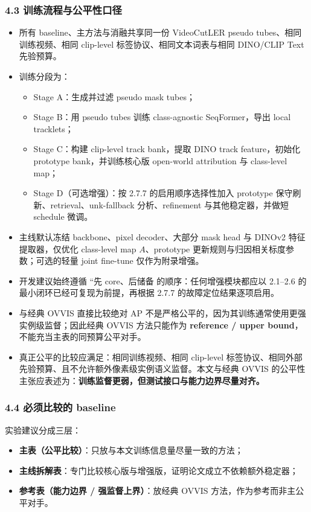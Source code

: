 \documentclass[UTF8]{ctexart}
\begin{document}
\subsubsection*{4.3 训练流程与公平性口径}
\begin{itemize}
\item 所有 baseline、主方法与消融共享同一份 VideoCutLER pseudo tubes、相同训练视频、相同 clip-level 标签协议、相同文本词表与相同 DINO/CLIP Text 先验预算。
\item 训练分段为：
\begin{itemize}
\item Stage A：生成并过滤 pseudo mask tubes；
\item Stage B：用 pseudo tubes 训练 class-agnostic SeqFormer，导出 local tracklets；
\item Stage C：构建 clip-level track bank，提取 DINO track feature，初始化 prototype bank，并训练核心版 open-world attribution 与 class-level map；
\item Stage D（可选增强）：按 2.7.7 的启用顺序选择性加入 prototype 保守刷新、retrieval、unk-fallback 分析、refinement 与其他稳定器，并做短 schedule 微调。
\end{itemize}
\item 主线默认冻结 backbone、pixel decoder、大部分 mask head 与 DINOv2 特征提取器，仅优化 class-level map $A$、prototype 更新规则与归因相关标度参数；可选的轻量 joint fine-tune 仅作为附录增强。
\item 开发建议始终遵循 ``先 core、后储备 的顺序：任何增强模块都应以 2.1--2.6 的最小闭环已经可复现为前提，再根据 2.7.7 的故障定位结果逐项启用。
\item 与经典 OVVIS 直接比较绝对 AP 不是严格公平的，因为其训练通常使用更强实例级监督；因此经典 OVVIS 方法只能作为 \textbf{reference / upper bound}，不能充当主表的同预算公平对手。
\item 真正公平的比较应满足：相同训练视频、相同 clip-level 标签协议、相同外部先验预算、且不允许额外像素级实例语义监督。本文与经典 OVVIS 的公平性主张应表述为：\textbf{训练监督更弱，但测试接口与能力边界尽量对齐。}
\end{itemize}

\subsubsection*{4.4 必须比较的 baseline}
实验建议分成三层：
\begin{itemize}
\item \textbf{主表（公平比较）}：只放与本文训练信息量尽量一致的方法；
\item \textbf{主线拆解表}：专门比较核心版与增强版，证明论文成立不依赖额外稳定器；
\item \textbf{参考表（能力边界 / 强监督上界）}：放经典 OVVIS 方法，作为参考而非主公平对手。
\end{itemize}
\end{document}
